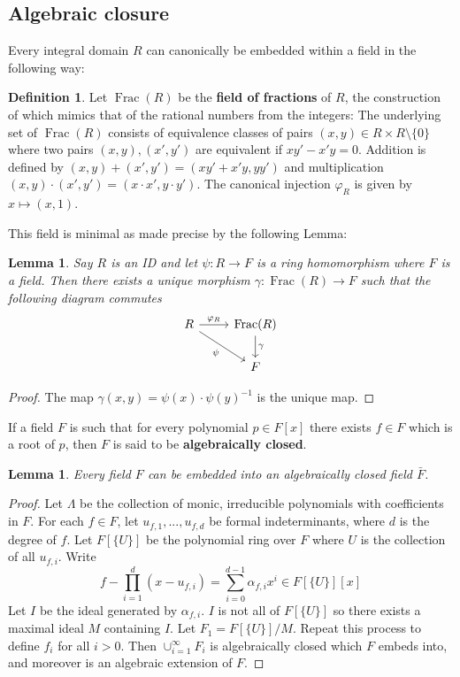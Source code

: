 \documentclass[12pt]{article}
\theoremstyle{plain}
\newtheorem{lemma}[thm]{Lemma}
\theoremstyle{definition}
\newtheorem{defn}[thm]{Definition} %
\begin{document}
\subsection{Algebraic closure}
\label{sec:fieldextensions}%
Every integral domain $R$ can canonically be embedded within a field in the following way:
\begin{defn}
Let $\operatorname{Frac}(R)$ be the \textbf{field of fractions} of $R$, the construction of which mimics that of the rational numbers from the integers: The underlying set of $\operatorname{Frac}(R)$ consists of equivalence classes of pairs $(x,y) \in R\times R\setminus\lbrace 0 \rbrace$ where two pairs $(x,y),(x',y')$ are equivalent if $xy' - x'y = 0$. Addition is defined by $(x,y) + (x',y') = (xy' + x'y,yy')$ and multiplication $(x,y)\cdot(x',y') = (x\cdot x',y\cdot y')$. The canonical injection $\varphi_R$ is given by $x \mapsto (x,1)$.
\end{defn}
%
This field is minimal as made precise by the following Lemma:
\begin{lemma}
\label{uniquenessoffff}
Say $R$ is an ID and let $\psi: R \to F$ is a ring homomorphism where $F$ is a field. Then there exists a unique morphism $\gamma: \operatorname{Frac}(R) \to F$ such that the following diagram commutes
\[
\begin{tikzcd}
R\arrow[r,"{\varphi_R}"]\arrow[dr,swap,"{\psi}"] & \operatorname{Frac}(R)\arrow[d,"{\gamma}"]\\
& F
\end{tikzcd}
\]
\end{lemma}
\begin{proof}
The map $\gamma(x,y) = \psi(x)\cdot\psi(y)^{-1}$ is the unique map.
\end{proof}
If a field $F$ is such that for every polynomial $p \in F[x]$ there exists $f \in F$ which is a root of $p$, then $F$ is said to be \textbf{algebraically closed}.
\begin{lemma}
\label{algebraicclosure}
Every field $F$ can be embedded into an algebraically closed field $\bar{F}$.
\end{lemma}
\begin{proof}
Let $\Lambda$ be the collection of monic, irreducible polynomials with coefficients in $F$. For each $f \in F$, let $u_{f,1},...,u_{f,d}$ be formal indeterminants, where $d$ is the degree of $f$. Let $F[\lbrace U\rbrace]$ be the polynomial ring over $F$ where $U$ is the collection of all $u_{f,i}$. Write
\[f - \prod_{i = 1}^d(x - u_{f,i}) = \sum_{i = 0}^{d-1}\alpha_{f,i}x^i \in F[\lbrace U \rbrace][x]\]
Let $I$ be the ideal generated by $\alpha_{f,i}$. $I$ is not all of $F[\lbrace U \rbrace]$ so there exists a maximal ideal $M$ containing $I$. Let $F_1 = F[\lbrace U \rbrace]/M$. Repeat this process to define $f_i$ for all $i > 0$. Then $\cup_{i = 1}^\infty F_i$ is algebraically closed which $F$ embeds into, and moreover is an algebraic extension of $F$.
\end{proof}
\end{document}
